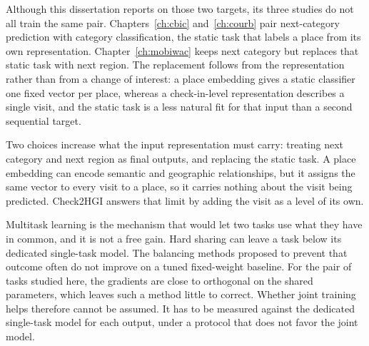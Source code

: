 Although this dissertation reports on those two targets, its three studies do not all
train the same pair. Chapters~\ref{ch:cbic}
and~\ref{ch:courb} pair next-category prediction with category classification, the
static task that labels a place from its own representation.
Chapter~\ref{ch:mobiwac} keeps next category but replaces that static task with next
region. The replacement follows from the representation rather than from a change of
interest: a place embedding gives a static classifier one fixed vector per place,
whereas a check-in-level representation describes a single visit, and the static task
is a less natural fit for that input than a second sequential target.

Two choices increase what the input representation must carry: treating next category
and next region as final outputs, and replacing the static task. A place embedding
can encode semantic and geographic relationships, but it assigns the same vector to
every visit to a place, so it carries nothing about the visit being predicted.
Check2HGI answers that limit by adding the visit as a level of its own.

Multitask learning is the mechanism that would let two tasks use what they have in
common, and it is not a free gain. Hard sharing can leave a task below its dedicated
single-task model. The balancing methods proposed to prevent that outcome often do not
improve on a tuned fixed-weight baseline. For the pair of tasks studied here, the
gradients are close to orthogonal on the shared parameters, which leaves such a method
little to correct. Whether joint training helps therefore cannot be assumed. It has to be
measured against the dedicated single-task model for each output, under a protocol
that does not favor the joint model.

